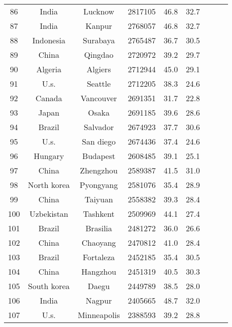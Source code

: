 \begin{table}
\begin{tabular}{ccccccccc}
  86 &               India &         Lucknow &    2817105 &     46.8 &     32.7 \\
  87 &               India &          Kanpur &    2768057 &     46.8 &     32.7 \\
  88 &           Indonesia &        Surabaya &    2765487 &     36.7 &     30.5 \\
  89 &               China &         Qingdao &    2720972 &     39.2 &     29.7 \\
  90 &             Algeria &         Algiers &    2712944 &     45.0 &     29.1 \\
  91 &                U.s. &         Seattle &    2712205 &     38.3 &     24.6 \\
  92 &              Canada &       Vancouver &    2691351 &     31.7 &     22.8 \\
  93 &               Japan &           Osaka &    2691185 &     39.6 &     28.6 \\
  94 &              Brazil &        Salvador &    2674923 &     37.7 &     30.6 \\
  95 &                U.s. &       San diego &    2674436 &     37.4 &     24.6 \\
  96 &             Hungary &        Budapest &    2608485 &     39.1 &     25.1 \\
  97 &               China &       Zhengzhou &    2589387 &     41.5 &     31.0 \\
  98 &         North korea &       Pyongyang &    2581076 &     35.4 &     28.9 \\
  99 &               China &         Taiyuan &    2558382 &     39.3 &     28.4 \\
 100 &          Uzbekistan &        Tashkent &    2509969 &     44.1 &     27.4 \\
 101 &              Brazil &        Brasilia &    2481272 &     36.0 &     26.6 \\
 102 &               China &        Chaoyang &    2470812 &     41.0 &     28.4 \\
 103 &              Brazil &       Fortaleza &    2452185 &     35.4 &     30.5 \\
 104 &               China &        Hangzhou &    2451319 &     40.5 &     30.3 \\
 105 &         South korea &           Daegu &    2449789 &     38.5 &     28.0 \\
 106 &               India &          Nagpur &    2405665 &     48.7 &     32.0 \\
 107 &                U.s. &     Minneapolis &    2388593 &     39.2 &     28.8 \\

\end{tabular}
\end{table}
